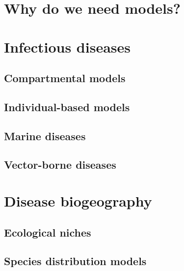 \section{\label{sec:Why do we need models?} Why do we need models?}

\section{\label{sec:Infectious diseases} Infectious
  diseases}

\subsection{\label{sec:Compartmental models} Compartmental models}

\subsection{\label{sec:Individual-based models} Individual-based models}

\subsection{\label{sec:Marine diseases} Marine diseases}

\subsection{\label{sec:Vector-borne diseases} Vector-borne diseases}

\section{\label{sec:Disease biogeography} Disease biogeography}

\subsection{\label{sec:Ecological niches} Ecological niches}


\subsection{\label{sec:Species distribution models} Species distribution
  models}


